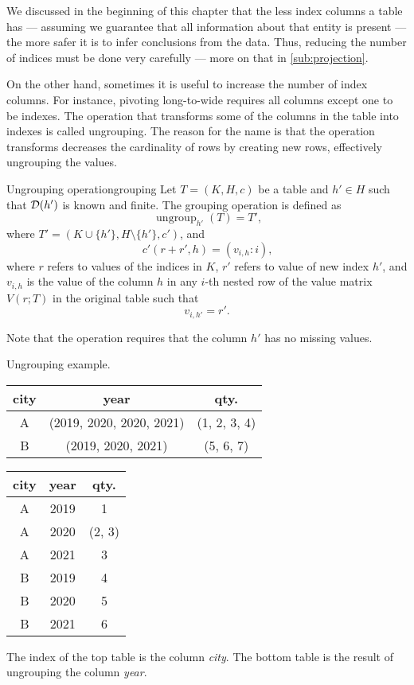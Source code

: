 We discussed in the beginning of this chapter that the less index columns a table has ---
assuming we guarantee that all information about that entity is present --- the more
safer it is to infer conclusions from the data.  Thus, reducing the number of indices
must be done very carefully --- more on that in \cref{sub:projection}.

On the other hand, sometimes it is useful to increase the number of index columns.  For
instance, pivoting long-to-wide requires all columns except one to be indexes.  The
operation that transforms some of the columns in the table into indexes is called ungrouping.
The reason for the name is that the operation transforms decreases the cardinality of rows
by creating new rows, effectively ungrouping the values.

\begin{defbox}{Ungrouping operation}{grouping}
  Let $T = (K, H, c)$ be a table and $h' \in H$ such that $\mathcal{D}\!\left(h'\right)$ is known and
  finite.  The grouping operation is defined as \[
    \operatorname{ungroup}_{h'}(T) = T'\text{,}
  \] where $T' = (K \cup \{h'\}, H \setminus \{h'\}, c')$, and \[
    c'(r + r', h) = (v_{i,h} : i)\text{,}
  \] where $r$ refers to values of the indices in $K$, $r'$ refers to value of new index
  $h'$, and $v_{i,h}$ is the value of the column $h$ in any $i$-th nested row of the value
  matrix $V(r; T)$ in the original table such that \[
    v_{i, h'} = r'\text{.}
  \]
\end{defbox}

Note that the operation requires that the column $h'$ has no missing values.

\begin{tablebox}[label=tab:ungroup]{Ungrouping example.}
  \centering
  \begin{tabular}{ccc}
    \toprule
    \textbf{city} & \textbf{year} & \textbf{qty.} \\
    \midrule
    A & (2019, 2020, 2020, 2021) & (1, 2, 3, 4) \\
    B & (2019, 2020, 2021) & (5, 6, 7) \\
    \bottomrule
  \end{tabular}

  \vspace{1em}
  \begin{tabular}{ccc}
    \toprule
    \textbf{city} & \textbf{year} & \textbf{qty.} \\
    \midrule
    A & 2019 & 1 \\
    A & 2020 & (2, 3) \\
    A & 2021 & 3 \\
    B & 2019 & 4 \\
    B & 2020 & 5 \\
    B & 2021 & 6 \\
    \bottomrule
  \end{tabular}
  \tcblower
  The index of the top table is the column \emph{city}.  The bottom table is the result of
  ungrouping the column \emph{year}.
\end{tablebox}


